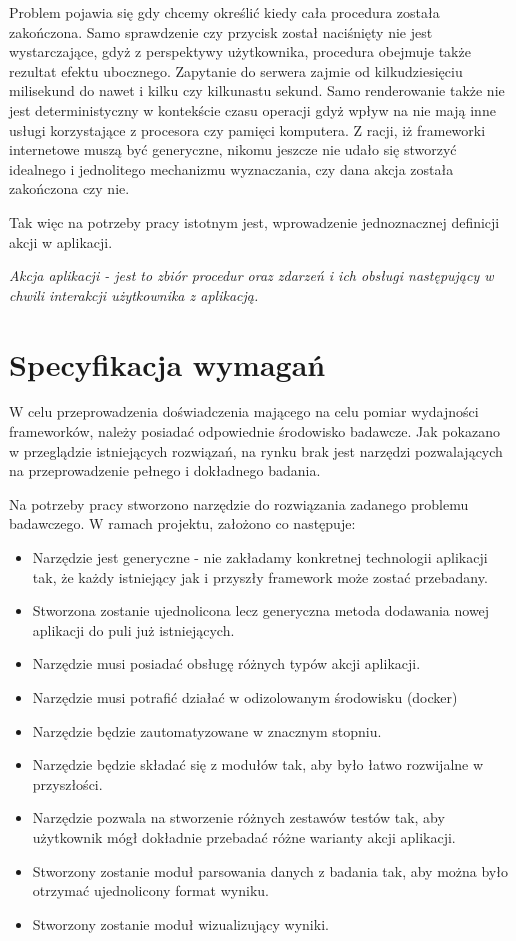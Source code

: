 Problem pojawia się gdy chcemy określić kiedy cała procedura została zakończona.
Samo sprawdzenie czy przycisk został naciśnięty nie jest wystarczające, gdyż z perspektywy użytkownika, procedura obejmuje także rezultat efektu ubocznego.
Zapytanie do serwera zajmie od kilkudziesięciu milisekund do nawet i kilku czy kilkunastu sekund.
Samo renderowanie także nie jest deterministyczny w kontekście czasu operacji gdyż wpływ na nie mają inne usługi korzystające z procesora czy pamięci komputera.
Z racji, iż frameworki internetowe muszą być generyczne, nikomu jeszcze nie udało się stworzyć idealnego i jednolitego mechanizmu wyznaczania, czy dana akcja została zakończona czy nie.

Tak więc na potrzeby pracy istotnym jest, wprowadzenie jednoznacznej definicji akcji w aplikacji.

\emph{Akcja aplikacji - jest to zbiór procedur oraz zdarzeń i ich obsługi następujący w chwili interakcji użytkownika z aplikacją.}



\section{Specyfikacja wymagań}

W celu przeprowadzenia doświadczenia mającego na celu pomiar wydajności frameworków, należy posiadać odpowiednie środowisko badawcze.
Jak pokazano w przeglądzie istniejących rozwiązań, na rynku brak jest narzędzi pozwalających na przeprowadzenie pełnego i dokładnego badania.

Na potrzeby pracy stworzono narzędzie do rozwiązania zadanego problemu badawczego. W ramach projektu, założono co następuje:

\begin{itemize}
    \item Narzędzie jest generyczne - nie zakładamy konkretnej technologii aplikacji tak, że każdy istniejący jak i przyszły framework może zostać przebadany.
    \item Stworzona zostanie ujednolicona lecz generyczna metoda dodawania nowej aplikacji do puli już istniejących. 
    \item Narzędzie musi posiadać obsługę różnych typów akcji aplikacji.
    \item Narzędzie musi potrafić działać w odizolowanym środowisku (docker)
    \item Narzędzie będzie zautomatyzowane w znacznym stopniu.
    \item Narzędzie będzie składać się z modułów tak, aby było łatwo rozwijalne w przyszłości.
    \item Narzędzie pozwala na stworzenie różnych zestawów testów tak, aby użytkownik mógł dokładnie przebadać różne warianty akcji aplikacji.
    \item Stworzony zostanie moduł parsowania danych z badania tak, aby można było otrzymać ujednolicony format wyniku.
    \item Stworzony zostanie moduł wizualizujący wyniki.
\end{itemize}

